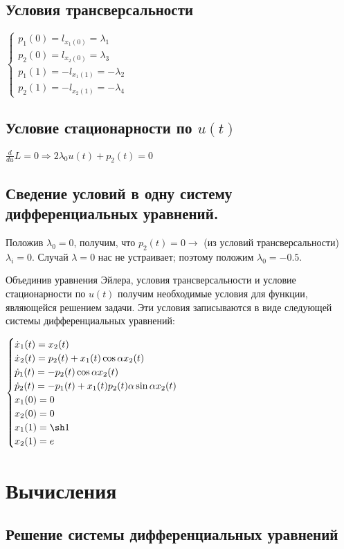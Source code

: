 \documentclass[24pt]{article}
\begin{document}
\subsection{Условия трансверсальности}
$
\begin{cases}
p_1(0) = l_{x_1(0)} = \lambda_1\\
p_2(0) = l_{x_2(0)} = \lambda_3\\
p_1(1) = -l_{x_1(1)} = -\lambda_2\\
p_2(1) = -l_{x_2(1)} = -\lambda_4
\end{cases}
$
\subsection{Условие стационарности по $u(t)$}
$
\frac{d}{du}L = 0 \Rightarrow 2\lambda_0u(t) + p_2(t) = 0
$
\subsection{Сведение условий в одну систему дифференциальных уравнений.}
Положив $\lambda_0 = 0$, получим, что $p_2(t) = 0 \rightarrow$ (из условий трансверсальности) $\lambda_i = 0$. Случай $\lambda = 0$ нас не устраивает; поэтому положим $\lambda_0 = -0.5$.

Объединив уравнения Эйлера, условия трансверсальности и условие стационарности по $u(t)$ получим необходимые условия для функции, являющейся решением задачи. Эти условия записываются в виде следующей системы дифференциальных уравнений:

$
\begin{cases}
\dot x_1(t) = x_2(t)\\
\dot x_2(t) = p_2(t) +x_1(t)\cos\alpha x_2 (t)\\
\dot p_1(t) = -p_2(t)\cos\alpha x_2(t)\\
\dot p_2(t) = -p_1(t) + x_1(t)p_2(t)\alpha\sin\alpha x_2(t)\\
x_1(0) = 0\\
x_2(0) = 0\\
x_1(1) = \sh 1\\
x_2(1) = e\\
\end{cases}
$
\section{Вычисления}
\subsection{Решение системы дифференциальных уравнений}
\end{document}
